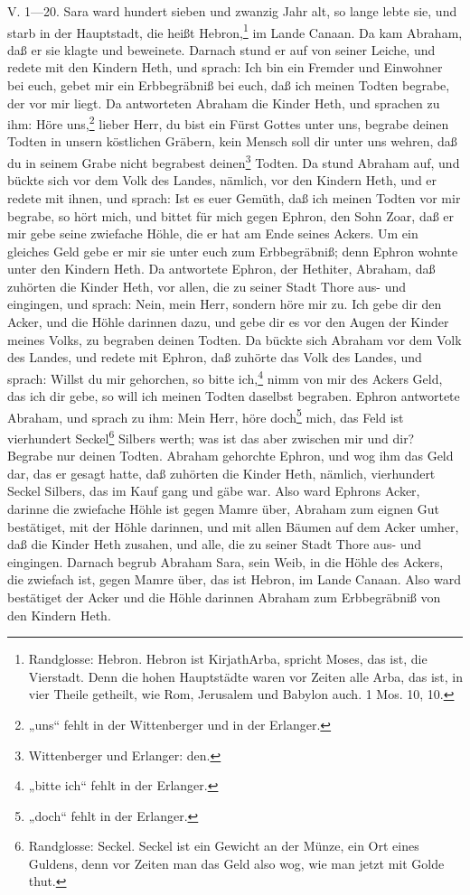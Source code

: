 V. 1—20. Sara ward hundert sieben und zwanzig Jahr alt, so lange lebte sie, und starb in der Hauptstadt, die heißt Hebron,\footnote{Randglosse: Hebron. Hebron ist KirjathArba, spricht Moses, das ist, die Vierstadt. Denn die hohen Hauptstädte waren vor Zeiten alle Arba, das ist, in vier Theile getheilt, wie Rom, Jerusalem und Babylon auch. 1 Mos. 10, 10.} im Lande Canaan. Da kam Abraham, daß er sie klagte und beweinete. Darnach stund er auf von seiner Leiche, und redete mit den Kindern Heth, und sprach: Ich bin ein Fremder und Einwohner bei euch, gebet mir ein Erbbegräbniß bei euch, daß ich meinen Todten begrabe, der vor mir liegt. Da antworteten Abraham die Kinder Heth, und sprachen zu ihm: Höre uns,\footnote{„uns“ fehlt in der Wittenberger und in der Erlanger.} lieber Herr, du bist ein Fürst Gottes unter uns, begrabe deinen Todten in unsern köstlichen Gräbern, kein Mensch soll dir unter uns wehren, daß du in seinem Grabe nicht begrabest deinen\footnote{Wittenberger und Erlanger: den.} Todten. Da stund Abraham auf, und bückte sich vor dem Volk des Landes, nämlich, vor den Kindern Heth, und er redete mit ihnen, und sprach: Ist es euer Gemüth, daß ich meinen Todten vor mir begrabe, so hört mich, und bittet für mich gegen Ephron, den Sohn Zoar, daß er mir gebe seine zwiefache Höhle, die er hat am Ende seines Ackers. Um ein gleiches Geld gebe er mir sie unter euch zum Erbbegräbniß; denn Ephron wohnte unter den Kindern Heth. Da antwortete Ephron, der Hethiter, Abraham, daß zuhörten die Kinder Heth, vor allen, die zu seiner Stadt Thore aus- und eingingen, und sprach: Nein, mein Herr, sondern höre mir zu. Ich gebe dir den Acker, und die Höhle darinnen dazu, und gebe dir es vor den Augen der Kinder meines Volks, zu begraben deinen Todten. Da bückte sich Abraham vor dem Volk des Landes, und redete mit Ephron, daß zuhörte das Volk des Landes, und sprach: Willst du mir gehorchen, so bitte ich,\footnote{„bitte ich“ fehlt in der Erlanger.} nimm von mir des Ackers Geld, das ich dir gebe, so will ich meinen Todten daselbst begraben. Ephron antwortete Abraham, und sprach zu ihm: Mein Herr, höre doch\footnote{„doch“ fehlt in der Erlanger.} mich, das Feld ist vierhundert Seckel\footnote{Randglosse: Seckel. Seckel ist ein Gewicht an der Münze, ein Ort eines Guldens, denn vor Zeiten man das Geld also wog, wie man jetzt mit Golde thut.} Silbers werth; was ist das aber zwischen mir und dir? Begrabe nur deinen Todten. Abraham gehorchte Ephron, und wog ihm das Geld dar, das er gesagt hatte, daß zuhörten die Kinder Heth, nämlich, vierhundert Seckel Silbers, das im Kauf gang und gäbe war. Also ward Ephrons Acker, darinne die zwiefache Höhle ist gegen Mamre über, Abraham zum eignen Gut bestätiget, mit der Höhle darinnen, und mit allen Bäumen auf dem Acker umher, daß die Kinder Heth zusahen, und alle, die zu seiner Stadt Thore aus- und eingingen. Darnach begrub Abraham Sara, sein Weib, in die Höhle des Ackers, die zwiefach ist, gegen Mamre über, das ist Hebron, im Lande Canaan. Also ward bestätiget der Acker und die Höhle darinnen Abraham zum Erbbegräbniß von den Kindern Heth.

